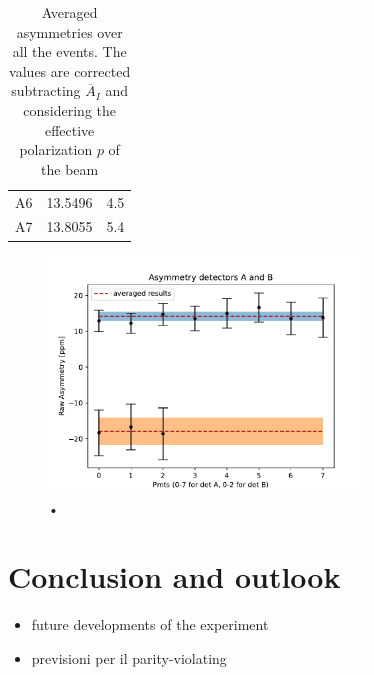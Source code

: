 \begin{table}[!ht]
{\begin{tabular}{lrr}
 A6    &   13.5496 &  4.5 \\
 A7    &   13.8055 &  5.4 \\
\hline
\end{tabular}}
\qquad
{}
\caption{Averaged asymmetries over all the events. The values are corrected subtracting $\overline{A}_{I}$ and considering the effective polarization $p$ of the beam}
\end{table}

\begin{figure}[hbtp]
\centering
\includegraphics[width = 0.75\textwidth]{Analysis/Dataselection/FirstResult.pdf}
\caption{•}
\end{figure}


\chapter{Conclusion and outlook} \label{conclusion}

\begin{itemize}
\item future developments of the experiment
\item previsioni per il parity-violating
\end{itemize}